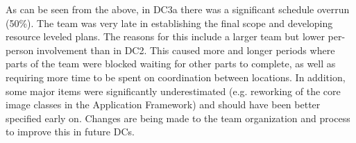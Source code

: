 As can be seen from the above, in DC3a there was  a significant schedule overrun (50\%).
The team was very late in establishing the final scope 
and developing resource leveled plans. The reasons for this include a larger team but
 lower per-person involvement than in DC2.
This caused more and longer periods where parts of the team were blocked
waiting for other parts to complete, as well as requiring more time to be spent 
on coordination between locations.
In addition, some major items were significantly underestimated (e.g. reworking of the core image classes
in the Application Framework) and should have been better specified early on.
Changes are being made to the team organization and process to improve this in future DCs.
